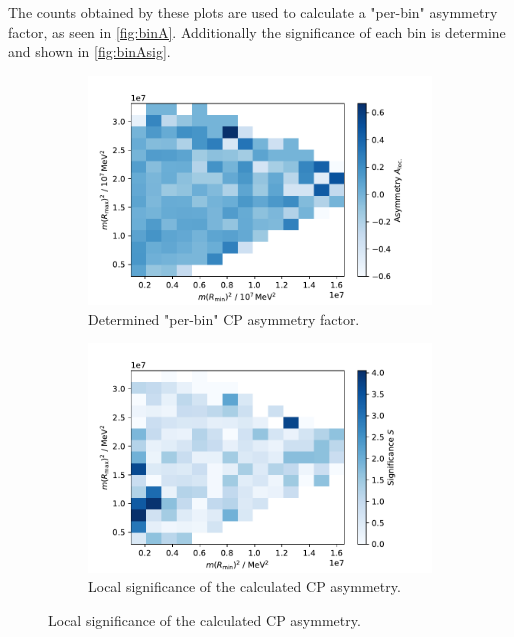 The counts obtained by these plots are used to calculate a "per-bin" asymmetry factor, as seen in \autoref{fig:binA}. Additionally the significance of each bin is determine and shown in \autoref{fig:binAsig}.
 
\begin{figure}[H]
	\centering
	\begin{subfigure}{0.45\textwidth}
		\includegraphics[width=\textwidth]{content/pictures/image_fin/DalitzDataBPhistACPV.pdf}
		\caption{Determined "per-bin"  CP asymmetry factor.}
		\label{fig:binA}
	\end{subfigure}
	\begin{subfigure}{0.45\textwidth}
		\includegraphics[width=\textwidth]{content/pictures/image_fin/DalitzDataBPhistACPVsig.pdf}
		\caption{Local significance of the calculated CP asymmetry.}
		\label{fig:binAsig}
	\end{subfigure} 
\end{figure}


